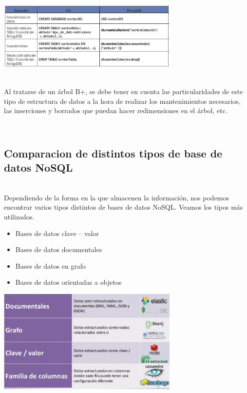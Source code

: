 \documentclass[twoside,onecolumn]{article}
\begin{document}
\begin{flushright}
\begin{itemize}
\begin{center}
		\includegraphics[width=9cm]{./Imagenes/3}
		\end{center}	
\textbf{}\\
Al tratarse de un árbol B+, se debe tener en cuenta las particularidades de este tipo de estructura de datos a la hora de realizar los mantenimientos necesarios, las inserciones y borrados que puedan hacer redimensiones en el árbol, etc.


\textbf{}\\
\subsection{Comparacion de distintos tipos de base de datos NoSQL}
\textbf{}\\Dependiendo de la forma en la que almacenen la información, nos podemos encontrar varios tipos
distintos de bases de datos NoSQL. Veamos los tipos más utilizados.
 \begin{itemize}
		\item Bases de datos clave – valor
                     \item Bases de datos documentales
		\item Bases de datos en grafo
		\item Bases de datos orientadas a objetos
	           \end{itemize}
\begin{center}
		\includegraphics[width=9cm]{./Imagenes/7}
		\end{center}	
\textbf{}\\

\end{itemize}
\end{flushright}
\end{document}
